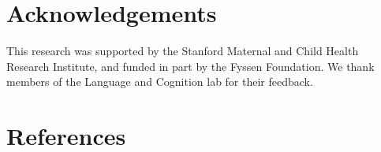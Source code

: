 \documentclass[10pt, letterpaper]{article}
\begin{document}
\hypertarget{acknowledgements}{%
\section{Acknowledgements}\label{acknowledgements}}

This research was supported by the Stanford Maternal and Child Health
Research Institute, and funded in part by the Fyssen Foundation. We
thank members of the Language and Cognition lab for their feedback.

\hypertarget{references}{%
\section{References}\label{references}}

\setlength{\parindent}{-0.1in} 
\setlength{\leftskip}{0.125in}

\noindent
\end{document}

